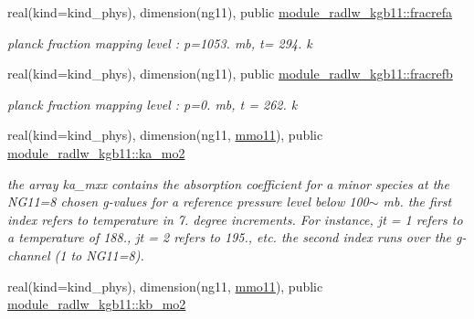 \begin{DoxyCompactItemize}
\mbox{\label{group__module__radlw__kgbnn_ga5bf6552fb9c1e7c35729b2aea885306e}} 
real(kind=kind\+\_\+phys), dimension(ng11), public \hyperlink{group__module__radlw__kgbnn_ga5bf6552fb9c1e7c35729b2aea885306e}{module\+\_\+radlw\+\_\+kgb11\+::fracrefa}
\begin{DoxyCompactList}\small\item\em planck fraction mapping level \+: p=1053. mb, t= 294. k \end{DoxyCompactList}\item 
\mbox{\label{group__module__radlw__kgbnn_ga0a89a2686ebc70a2c0d8577b89384a56}} 
real(kind=kind\+\_\+phys), dimension(ng11), public \hyperlink{group__module__radlw__kgbnn_ga0a89a2686ebc70a2c0d8577b89384a56}{module\+\_\+radlw\+\_\+kgb11\+::fracrefb}
\begin{DoxyCompactList}\small\item\em planck fraction mapping level \+: p=0. mb, t = 262. k \end{DoxyCompactList}\item 
\mbox{\label{group__module__radlw__kgbnn_ga8791eb290525c0d08fefa33ca23569c8}} 
real(kind=kind\+\_\+phys), dimension(ng11, \hyperlink{group__module__radlw__kgbnn_ga6aabd24aa785ef8689c63b01aaaab243}{mmo11}), public \hyperlink{group__module__radlw__kgbnn_ga8791eb290525c0d08fefa33ca23569c8}{module\+\_\+radlw\+\_\+kgb11\+::ka\+\_\+mo2}
\begin{DoxyCompactList}\small\item\em the array ka\+\_\+mxx contains the absorption coefficient for a minor species at the N\+G11=8 chosen g-\/values for a reference pressure level below 100$\sim$ mb. the first index refers to temperature in 7. degree increments. For instance, jt = 1 refers to a temperature of 188., jt = 2 refers to 195., etc. the second index runs over the g-\/channel (1 to N\+G11=8). \end{DoxyCompactList}\item 
\mbox{\label{group__module__radlw__kgbnn_gaebc48e152bb90794b6d0b426f6c5f9e4}} 
real(kind=kind\+\_\+phys), dimension(ng11, \hyperlink{group__module__radlw__kgbnn_ga6aabd24aa785ef8689c63b01aaaab243}{mmo11}), public \hyperlink{group__module__radlw__kgbnn_gaebc48e152bb90794b6d0b426f6c5f9e4}{module\+\_\+radlw\+\_\+kgb11\+::kb\+\_\+mo2}

\end{DoxyCompactItemize}
